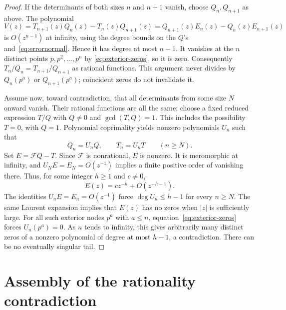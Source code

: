\documentclass[11pt]{article}
\theoremstyle{remark}
\begin{document}
\begin{proof}
If the determinants of both sizes $n$ and $n+1$ vanish, choose
$Q_n,Q_{n+1}$ as above. The polynomial
\[
 V(z)=T_{n+1}(z)Q_n(z)-T_n(z)Q_{n+1}(z)
     =Q_{n+1}(z)E_n(z)-Q_n(z)E_{n+1}(z)
\]
is $O(z^{n-1})$ at infinity, using the degree bounds on the $Q$'s
and~\eqref{eq:errornormal}. Hence it has degree at most $n-1$.
It vanishes at the $n$ distinct points $p,p^2,\ldots,p^n$ by
\eqref{eq:exterior-zeros}, so it is zero. Consequently
$T_n/Q_n=T_{n+1}/Q_{n+1}$ as rational functions. This argument never
divides by $Q_n(p^a)$ or $Q_{n+1}(p^a)$; coincident zeros do not
invalidate it.

Assume now, toward contradiction, that all determinants from some
size $N$ onward vanish. Their rational functions are all the same;
choose a fixed reduced expression $T/Q$ with $Q\ne0$ and
$\gcd(T,Q)=1$. This includes the possibility $T=0$, with $Q=1$.
Polynomial coprimality yields nonzero polynomials $U_n$ such that
\[
 Q_n=U_nQ,\qquad T_n=U_nT\qquad(n\ge N).
\]
Set $E=\mathcal FQ-T$. Since $\mathcal F$ is nonrational, $E$ is
nonzero. It is meromorphic at infinity, and
$U_NE=E_N=O(z^{-1})$ implies a finite positive order of vanishing
there. Thus, for some integer $h\ge1$ and $c\ne0$,
\[
 E(z)=cz^{-h}+O(z^{-h-1}).
\]
The identities $U_nE=E_n=O(z^{-1})$ force $\deg U_n\le h-1$ for
every $n\ge N$. The same Laurent expansion implies that $E(z)$ has
no zeros when $|z|$ is sufficiently large. For all such exterior
nodes $p^a$ with $a\le n$, equation~\eqref{eq:exterior-zeros} forces
$U_n(p^a)=0$. As $n$ tends to infinity, this gives arbitrarily many
distinct zeros of a nonzero polynomial of degree at most $h-1$, a
contradiction. There can be no eventually singular tail.
\end{proof}

\section{Assembly of the rationality contradiction}
\end{document}
